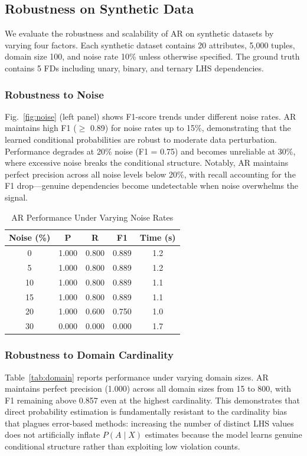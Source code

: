 \documentclass[conference]{IEEEtran}
\begin{document}
\subsection{Robustness on Synthetic Data}\label{sec:exp_synthetic}

We evaluate the robustness and scalability of AR on synthetic datasets by varying four factors. Each synthetic dataset contains 20 attributes, 5,000 tuples, domain size 100, and noise rate 10\% unless otherwise specified. The ground truth contains 5 FDs including unary, binary, and ternary LHS dependencies.

\subsubsection{Robustness to Noise}
Fig.~\ref{fig:noise} (left panel) shows F1-score trends under different noise rates. AR maintains high F1 ($\geq$ 0.89) for noise rates up to 15\%, demonstrating that the learned conditional probabilities are robust to moderate data perturbation. Performance degrades at 20\% noise (F1 = 0.75) and becomes unreliable at 30\%, where excessive noise breaks the conditional structure. Notably, AR maintains perfect precision across all noise levels below 20\%, with recall accounting for the F1 drop---genuine dependencies become undetectable when noise overwhelms the signal.

\begin{table}[t]
\caption{AR Performance Under Varying Noise Rates}
\label{tab:noise}
\centering
\begin{tabular}{ccccc}
\toprule
\textbf{Noise (\%)} & \textbf{P} & \textbf{R} & \textbf{F1} & \textbf{Time (s)} \\
\midrule
0 & 1.000 & 0.800 & 0.889 & 1.2 \\
5 & 1.000 & 0.800 & 0.889 & 1.2 \\
10 & 1.000 & 0.800 & 0.889 & 1.1 \\
15 & 1.000 & 0.800 & 0.889 & 1.1 \\
20 & 1.000 & 0.600 & 0.750 & 1.0 \\
30 & 0.000 & 0.000 & 0.000 & 1.7 \\
\bottomrule
\end{tabular}
\end{table}

\subsubsection{Robustness to Domain Cardinality}
Table~\ref{tab:domain} reports performance under varying domain sizes. AR maintains perfect precision (1.000) across all domain sizes from 15 to 800, with F1 remaining above 0.857 even at the highest cardinality. This demonstrates that direct probability estimation is fundamentally resistant to the cardinality bias that plagues error-based methods: increasing the number of distinct LHS values does not artificially inflate $P(A \mid X)$ estimates because the model learns genuine conditional structure rather than exploiting low violation counts.
\end{document}
